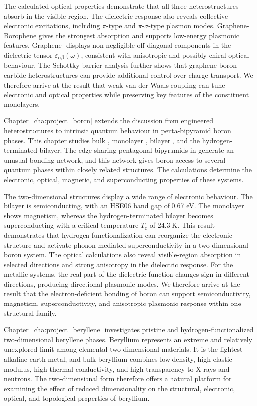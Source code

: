 The calculated optical properties demonstrate that all three heterostructures absorb in the visible region.
The dielectric response also reveals collective electronic excitations, including $\pi$-type and $\pi$-$\sigma$-type plasmon modes.
Graphene-Borophene gives the strongest absorption and supports low-energy plasmonic features.
Graphene- displays non-negligible off-diagonal components in the dielectric tensor $\varepsilon_{\alpha\beta}(\omega)$, consistent with anisotropic and possibly chiral optical behaviour.
The Schottky barrier analysis further shows that graphene-boron-carbide heterostructures can provide additional control over charge transport.
We therefore arrive at the result that weak van der Waals coupling can tune electronic and optical properties while preserving key features of the constituent monolayers.

Chapter~\ref{cha:project_boron} extends the discussion from engineered heterostructures to intrinsic quantum behaviour in penta-bipyramid boron phases.
This chapter studies bulk , monolayer , bilayer , and the hydrogen-terminated bilayer.
The edge-sharing pentagonal bipyramids in  generate an unusual bonding network, and this network gives boron access to several quantum phases within closely related structures.
The calculations determine the electronic, optical, magnetic, and superconducting properties of these systems.

The two-dimensional  structures display a wide range of electronic behaviour.
The bilayer is semiconducting, with an HSE06 band gap of 0.67 eV.
The monolayer shows magnetism, whereas the hydrogen-terminated bilayer becomes superconducting with a critical temperature $T_\mathrm{c}$ of 24.3 K.
This result demonstrates that hydrogen functionalization can reorganize the electronic structure and activate phonon-mediated superconductivity in a two-dimensional boron system.
The optical calculations also reveal visible-region absorption in selected directions and strong anisotropy in the dielectric response.
For the metallic systems, the real part of the dielectric function changes sign in different directions, producing directional plasmonic modes.
We therefore arrive at the result that the electron-deficient bonding of boron can support semiconductivity, magnetism, superconductivity, and anisotropic plasmonic response within one structural family.

Chapter~\ref{cha:project_beryllene} investigates pristine and hydrogen-functionalized two-dimensional beryllene phases.
Beryllium represents an extreme and relatively unexplored limit among elemental two-dimensional materials.
It is the lightest alkaline-earth metal, and bulk beryllium combines low density, high elastic modulus, high thermal conductivity, and high transparency to X-rays and neutrons.
The two-dimensional form therefore offers a natural platform for examining the effect of reduced dimensionality on the structural, electronic, optical, and topological properties of beryllium.

